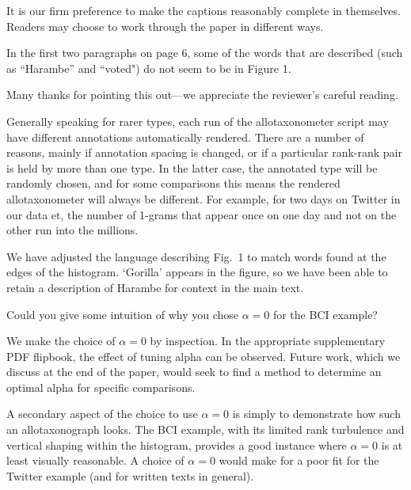 It is our firm preference to make the captions reasonably complete
in themselves.
Readers may choose to work through the paper in different ways.

\begin{reviewercomment}
  In the first two paragraphs on page 6, some of the words that are
  described (such as ``Harambe'' and ``voted") do not seem to be in
  Figure 1.
\end{reviewercomment}

Many thanks for pointing this out---we appreciate the reviewer's
careful reading.

Generally speaking for rarer types, each run of the allotaxonometer
script may have different annotations automatically rendered.
There are a number of reasons, mainly if annotation spacing is changed,
or if a particular rank-rank pair is held by more than one type.
In the latter case, the annotated type will be randomly chosen,
and for some comparisons this means the rendered allotaxonometer will
always be different.
For example, for two days on Twitter in our data et,
the number of 1-grams that appear once on one day and not on the other
run into the millions.

We have adjusted the language describing
Fig.~1 to match words found at the edges of the histogram. `Gorilla'
appears in the figure, so we have been able to retain a description of Harambe for
context in the main text.


\begin{reviewercomment}
  Could you give some intuition of why you chose $\alpha = 0$ for the
  BCI example?
\end{reviewercomment}

We make the choice of $\alpha = 0$ by inspection.
In the appropriate supplementary PDF flipbook, the effect of tuning alpha can be observed.
Future work, which we discuss at the end of the paper, would seek to find
a method to determine an optimal alpha for specific comparisons.

A secondary aspect of the choice to use $\alpha = 0$ is simply to demonstrate
how such an allotaxonograph looks.
The BCI example, with its limited rank
turbulence and vertical shaping within the histogram, provides 
a good instance where $\alpha = 0$ is at least visually reasonable.
A choice of $\alpha = 0$
would make for a poor fit for the Twitter example (and for written texts in general).

